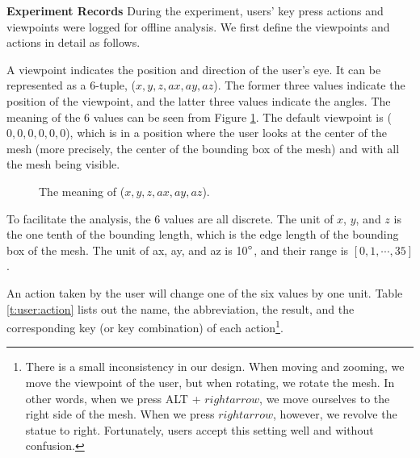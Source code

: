\textbf{Experiment Records}
During the experiment, users' key press actions and viewpoints
were logged for offline analysis. We first define the viewpoints
and actions in detail as follows.

A viewpoint indicates the position and direction of the user's eye.
It can be represented as a 6-tuple, ($x, y, z, ax, ay, az$). The former
three values indicate the position of the viewpoint, 
and the latter three values indicate the angles. 
The meaning of the 6 values can be seen from Figure
\ref{f:user:viewpoint}. The default viewpoint is ($0, 0, 0, 0, 0, 0$), which
is in a position where the user looks at the center of the mesh
(more precisely, the center of the bounding box of the mesh) and with
all the mesh being visible.
\begin{figure}
    \centering
    \caption{The meaning of ($x, y, z, ax, ay, az$).}
    \label{f:user:viewpoint}
\end{figure}

To facilitate the analysis, the 6 values are all discrete. The unit of $x$, 
$y$, and $z$ is the one tenth of the bounding length, which is the edge length
of the bounding box of the mesh. The unit of ax, ay, and az is 10$^\circ$,
and their range is $[0, 1, \cdots, 35]$.

An action taken by the user will change one of the six values by one unit.
Table \ref{t:user:action} lists out the name, the abbreviation, the result,
and the corresponding key (or key combination) of each action\footnote{
There is a small inconsistency in our design. When moving and zooming, 
we move the viewpoint of the user, 
but when rotating, we rotate the mesh. 
In other words, when we press ALT + $rightarrow$, 
we move ourselves to the right side of the mesh. 
When we press $rightarrow$, however, we revolve the statue to right. 
Fortunately, users accept this setting well and without confusion.}.

